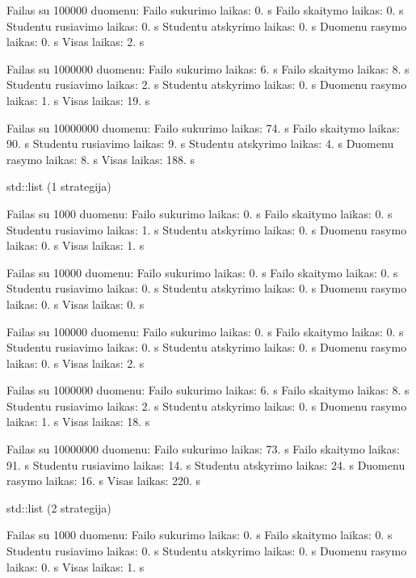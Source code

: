 Failas su 100000 duomenu\+: Failo sukurimo laikas\+: 0. s Failo skaitymo laikas\+: 0. s Studentu rusiavimo laikas\+: 0. s Studentu atskyrimo laikas\+: 0. s Duomenu rasymo laikas\+: 0. s Visas laikas\+: 2. s

Failas su 1000000 duomenu\+: Failo sukurimo laikas\+: 6. s Failo skaitymo laikas\+: 8. s Studentu rusiavimo laikas\+: 2. s Studentu atskyrimo laikas\+: 0. s Duomenu rasymo laikas\+: 1. s Visas laikas\+: 19. s

Failas su 10000000 duomenu\+: Failo sukurimo laikas\+: 74. s Failo skaitymo laikas\+: 90. s Studentu rusiavimo laikas\+: 9. s Studentu atskyrimo laikas\+: 4. s Duomenu rasymo laikas\+: 8. s Visas laikas\+: 188. s

std\+::list (1 strategija)

Failas su 1000 duomenu\+: Failo sukurimo laikas\+: 0. s Failo skaitymo laikas\+: 0. s Studentu rusiavimo laikas\+: 1. s Studentu atskyrimo laikas\+: 0. s Duomenu rasymo laikas\+: 0. s Visas laikas\+: 1. s

Failas su 10000 duomenu\+: Failo sukurimo laikas\+: 0. s Failo skaitymo laikas\+: 0. s Studentu rusiavimo laikas\+: 0. s Studentu atskyrimo laikas\+: 0. s Duomenu rasymo laikas\+: 0. s Visas laikas\+: 0. s

Failas su 100000 duomenu\+: Failo sukurimo laikas\+: 0. s Failo skaitymo laikas\+: 0. s Studentu rusiavimo laikas\+: 0. s Studentu atskyrimo laikas\+: 0. s Duomenu rasymo laikas\+: 0. s Visas laikas\+: 2. s

Failas su 1000000 duomenu\+: Failo sukurimo laikas\+: 6. s Failo skaitymo laikas\+: 8. s Studentu rusiavimo laikas\+: 2. s Studentu atskyrimo laikas\+: 0. s Duomenu rasymo laikas\+: 1. s Visas laikas\+: 18. s

Failas su 10000000 duomenu\+: Failo sukurimo laikas\+: 73. s Failo skaitymo laikas\+: 91. s Studentu rusiavimo laikas\+: 14. s Studentu atskyrimo laikas\+: 24. s Duomenu rasymo laikas\+: 16. s Visas laikas\+: 220. s

std\+::list (2 strategija)

Failas su 1000 duomenu\+: Failo sukurimo laikas\+: 0. s Failo skaitymo laikas\+: 0. s Studentu rusiavimo laikas\+: 0. s Studentu atskyrimo laikas\+: 0. s Duomenu rasymo laikas\+: 0. s Visas laikas\+: 1. s

